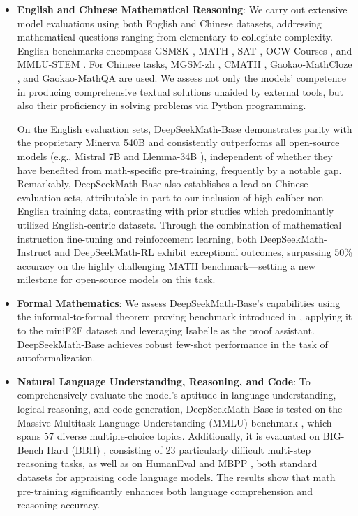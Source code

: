 \begin{itemize}[topsep=0pt]
    \item \textbf{English and Chinese Mathematical Reasoning}: We carry out extensive model evaluations using both English and Chinese datasets, addressing mathematical questions ranging from elementary to collegiate complexity. English benchmarks encompass GSM8K \citep{gsm8k}, MATH \citep{MATH}, SAT \citep{llemma}, OCW Courses \citep{minerva}, and MMLU-STEM \citep{mmlu}. For Chinese tasks, MGSM-zh \citep{mgsm}, CMATH \citep{wei2023cmath}, Gaokao-MathCloze \citep{agieval}, and Gaokao-MathQA \citep{agieval} are used. We assess not only the models’ competence in producing comprehensive textual solutions unaided by external tools, but also their proficiency in solving problems via Python programming.

    On the English evaluation sets, DeepSeekMath-Base demonstrates parity with the proprietary Minerva 540B \citep{minerva} and consistently outperforms all open-source models (e.g., Mistral 7B \citep{mistral} and Llemma-34B \citep{llemma}), independent of whether they have benefited from math-specific pre-training, frequently by a notable gap. Remarkably, DeepSeekMath-Base also establishes a lead on Chinese evaluation sets, attributable in part to our inclusion of high-caliber non-English training data, contrasting with prior studies \citep{minerva,llemma} which predominantly utilized English-centric datasets. Through the combination of mathematical instruction fine-tuning and reinforcement learning, both DeepSeekMath-Instruct and DeepSeekMath-RL exhibit exceptional outcomes, surpassing 50\% accuracy on the highly challenging MATH benchmark—setting a new milestone for open-source models on this task.

\item \textbf{Formal Mathematics}: We assess DeepSeekMath-Base's capabilities using the informal-to-formal theorem proving benchmark introduced in \citep{dsp_proof}, applying it to the miniF2F dataset \citep{minif2f} and leveraging Isabelle \citep{isabelle} as the proof assistant. DeepSeekMath-Base achieves robust few-shot performance in the task of autoformalization.

\item \textbf{Natural Language Understanding, Reasoning, and Code}: To comprehensively evaluate the model’s aptitude in language understanding, logical reasoning, and code generation, DeepSeekMath-Base is tested on the Massive Multitask Language Understanding (MMLU) benchmark \citep{mmlu}, which spans 57 diverse multiple-choice topics. Additionally, it is evaluated on BIG-Bench Hard (BBH) \citep{bbh}, consisting of 23 particularly difficult multi-step reasoning tasks, as well as on HumanEval \citep{codex} and MBPP \citep{mbpp}, both standard datasets for appraising code language models. The results show that math pre-training significantly enhances both language comprehension and reasoning accuracy.


\end{itemize}
